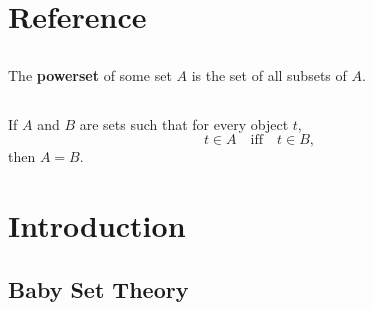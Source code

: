 \documentclass{report}
\begin{document}

\tableofcontents

\begingroup
\renewcommand\thechapter{R}
\setcounter{chapter}{0}
\addtocounter{chapter}{-1}

\chapter{Reference}%
\label{chap:reference}

\section{}%
\label{ref:powerset}

The \textbf{powerset} of some set $A$ is the set of all subsets of $A$.

\begin{definition}


\end{definition}

\section{}%
\label{ref:principle-extensionality}

If $A$ and $B$ are sets such that for every object $t$,
  $$t \in A \quad\text{iff}\quad t \in B,$$
  then $A = B$.

\begin{axiom}


\end{axiom}

\endgroup

\chapter{Introduction}%
\label{chap:introduction}

\section{Baby Set Theory}%
\label{sec:baby-set-theory}

\subsection{}%
\label{sub:baby-set-theory-1}
\end{document}

